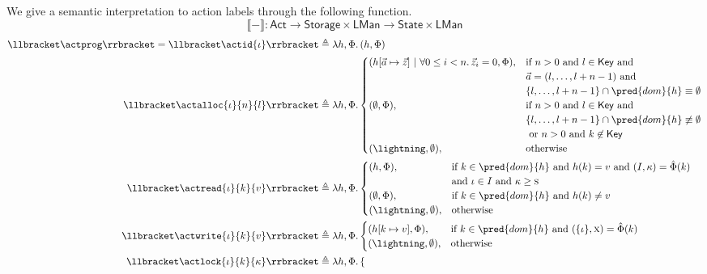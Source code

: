 We give a semantic interpretation to action labels through the following function.
\[
\llbracket - \rrbracket : \mathsf{Act} \rightarrow \mathsf{Storage} \times \mathsf{LMan} \rightarrow \mathsf{State} \times \mathsf{LMan}
\]
\begin{align*}
\llbracket \actprog \rrbracket = \llbracket \actid{\iota} \rrbracket &\triangleq \lambda h, \Phi \ldotp (h,\Phi) \\
\llbracket \actalloc{\iota}{n}{l} \rrbracket &\triangleq \lambda h, \Phi \ldotp
\begin{cases}
(h[\vec{a} \mapsto \vec{z}]\ |\ \forall 0 \leq i < n \ldotp \vec{z}_i = 0, \Phi),
&
\text{if } n > 0 \text{ and } l \in \mathsf{Key} \text{ and } \\
& \vec{a} = (l, \ldots, l + n - 1) \text{ and } \\
& \{ l, \ldots, l + n - 1 \} \cap \pred{dom}{h} \equiv \emptyset \\
(\emptyset, \Phi), & \text{if } n > 0 \text{ and } l \in \mathsf{Key} \text{ and } \\
& \{ l, \ldots, l + n - 1 \} \cap \pred{dom}{h} \not\equiv \emptyset \\
& \text{ or } n > 0 \text{ and } k \not\in \mathsf{Key} \\
(\lightning, \emptyset), & \text{otherwise}
\end{cases} \\
\llbracket \actread{\iota}{k}{v} \rrbracket &\triangleq \lambda h, \Phi \ldotp
\begin{cases}
(h, \Phi), & \text{if } k \in \pred{dom}{h} \text{ and } h(k) = v \text{ and } (I, \kappa) = \hat{\Phi}(k) \\ & \text{and } \iota \in I \text{ and } \kappa \geq \textsc{s} \\
(\emptyset, \Phi), & \text{if } k \in \pred{dom}{h} \text{ and } h(k) \neq v \\
(\lightning, \emptyset), & \text{otherwise}
\end{cases} \\
\llbracket \actwrite{\iota}{k}{v} \rrbracket &\triangleq \lambda h, \Phi \ldotp
\begin{cases}
(h[k \mapsto v], \Phi), & \text{if } k \in \pred{dom}{h} \text{ and } (\{\iota\}, \textsc{x}) = \hat{\Phi}(k) \\
(\lightning, \emptyset), & \text{otherwise}
\end{cases} \\
\llbracket \actlock{\iota}{k}{\kappa} \rrbracket &\triangleq \lambda h, \Phi \ldotp
\begin{cases}

\end{cases}
\end{align*}
